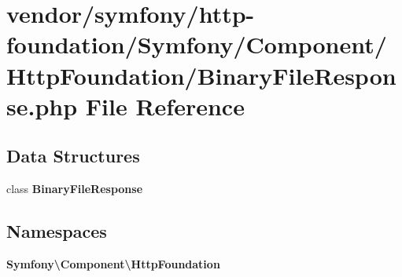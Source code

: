 \section{vendor/symfony/http-\/foundation/\+Symfony/\+Component/\+Http\+Foundation/\+Binary\+File\+Response.php File Reference}
\label{_binary_file_response_8php}
\subsection*{Data Structures}
\begin{DoxyCompactItemize}
\item 
class {\bf Binary\+File\+Response}
\end{DoxyCompactItemize}
\subsection*{Namespaces}
\begin{DoxyCompactItemize}
\item 
 {\bf Symfony\textbackslash{}\+Component\textbackslash{}\+Http\+Foundation}
\end{DoxyCompactItemize}
